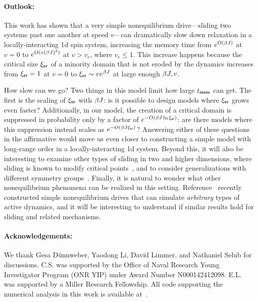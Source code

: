 \documentclass[prl,aps,twocolumn,groupedaddress,superscriptaddress,preprintnumbers,nobibnotes]{revtex4-2}
\newcommand{\tmem}{{t_{\sf mem}}}
\newcommand{\ler}{{\xi_{\sf er}}} %
\begin{document}
	\paragraph{Outlook: } 
	This work has shown that a very simple nonequilibrium drive---sliding two systems past one another at speed $v$---can dramatically slow down relaxation in a locally-interacting 1d spin system, increasing the memory time from $e^{O(\beta J)}$ at $v=0$ to $e^{O(v(\beta J)^2  )}$ at $v>v_c$, where $v_c \leq 1$. This increase happens because the critical size $\ler$ of a minority domain that is not eroded by the dynamics increases from $\ler = 1$ at $v=0$ to $\ler \sim v e^{\b J}$ at large enough $\beta J, v$. 
	
	How slow can we go? Two things in this model limit how large $\tmem$ can get. The first is the scaling of $\ler$ with $\beta J$: is it possible to design models where $\ler$ grows even faster? Additionally, in our model, the creation of a critical domain is suppressed in probability only by a factor of $e^{-O(\b J \ln \ler)}$: are there models where this suppression instead scales as $e^{-O(\b J \ler)}$? Answering either of these questions in the affirmative would move us even closer to constructing a simple model with long-range order in a locally-interacting 1d system.  
	Beyond this, it will also be interesting to examine other types of sliding in two and higher dimensions, where sliding is known to modify critical points~\cite{hucht2009nonequilibrium,angst2012strongly}, and to consider generalizations with different symmetry groups~\cite{igloi2011nonequilibrium}. Finally, it is natural to wonder what other nonequilibrium phenomena can be realized in this setting. Reference~\cite{stahl2026brownian} recently constructed simple nonequilibrium drives that can simulate {\it arbitrary} types of active dynamics, and it will be interesting to understand if similar results hold for sliding and related mechanisms. 
	
	\paragraph*{Acknowledgements: } 
	We thank Gesa D{\"u}nnweber, Yaodong Li, David Limmer, and Nathaniel Selub for discussions. C.S. was supported by the Office of Naval Research Young Investigator Program (ONR YIP) under Award Number N000142412098. E.L. was supported by a Miller Research Fellowship. All code supporting the numerical analysis in this work is available at~\cite{code}. 
	
	
	
	\appendix 
	
	\
\end{document}
